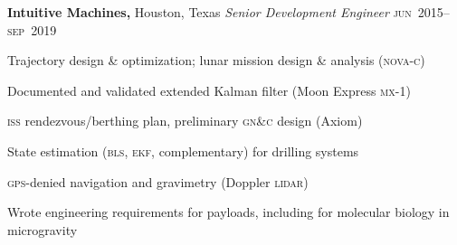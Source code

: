 \documentclass[12pt,letterpaper]{article}
\newenvironment{itemize*}%
{\begin{itemize}%
  \setlength{\itemsep}{0pt}}%
{\end{itemize}}
\newcommand{\rdate}[1]{{\hfill #1}}
\begin{document}
\medskip
\textbf{Intuitive Machines,} Houston, Texas \newline
\emph{Senior Development Engineer} \rdate{\textsc{jun}~2015--\textsc{sep}~2019} %
\begin{itemize*}
  \item Trajectory design \& optimization; lunar mission design \& analysis (\textsc{nova-c})%
  \item Documented and validated extended Kalman filter (Moon Express \textsc{mx}-1)
  \item \textsc{iss} rendezvous/berthing plan, preliminary \textsc{gn\&c} design (Axiom) %
  \item State estimation (\textsc{bls}, \textsc{ekf}, complementary) for drilling systems
  \item \textsc{gps}-denied navigation and gravimetry (Doppler \textsc{lidar})
  \item Wrote engineering requirements for payloads, including for molecular biology in microgravity
% 
\end{itemize*}
\end{document}
